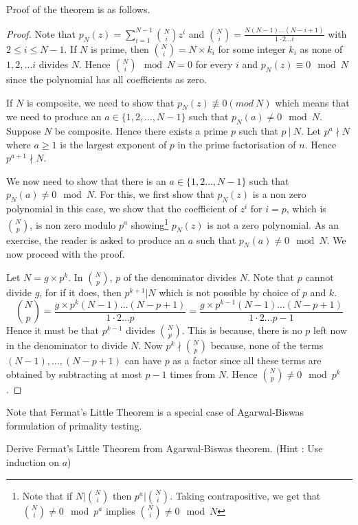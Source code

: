Proof of the theorem is as follows.
\begin{proof}
	Note that $p_N(z) = \sum_{i=1}^{N-1} \binom{N}{i} z^i$ and
	$\binom{N}{i} = \frac{N(N-1)\ldots (N-i+1)}{1\cdot 2 \ldots i}$ with $2
	\le i \le N-1$. 
	If $N$ is prime, then $\binom{N}{i} = N \times k_i$ for some integer
	$k_i$ as none of $1, 2, \ldots i$ divides $N$. Hence $\binom{N}{i}
	\mod N = 0$ for every $i$ and $p_N(z) \equiv 0 \mod N$ since the
	polynomial has all coefficients as zero.

	If $N$ is composite, we need to show that $p_N(z) \not 
	\equiv 0 (mod~ N)$ which means that we need to produce an $a \in
	\{1,2,\ldots, N-1\}$ such that $p_N(a) \ne 0 \mod N$. Suppose $N$ be
	composite. Hence there exists a prime $p$ such that $p ~|~
	N$.  Let $p^a \nmid N$ where $a \ge 1$ is the largest exponent of $p$ in
	the prime factorisation of $n$. Hence $p^{a+1} \nmid N$.
	
	We now need to show that there is an $a \in \{1,2\ldots, N-1\}$ such
	that $p_N(a) \ne 0 \mod N$. For this, we first show that $p_N(z)$ is a 
	non zero polynomial in this case, we 
	show that the coefficient of $z^i$ for $i = p$, which is
	$\binom{N}{p}$, is non zero modulo $p^a$ showing\footnote{Note that if
		$N|\binom{N}{i}$ then $p^a | \binom{N}{i}$. Taking
		contrapositive, we get that $\binom{N}{i} \not = 0 \mod p^a$
		implies $\binom{N}{i} \not = 0 \mod N$} $p_N(z)$ is not a zero
		polynomial. As an exercise, the reader is asked to produce an
		$a$ such that $p_N(a) \ne 0 \mod N$. We now proceed with the
		proof.

	Let $N = g \times p^k$. In $\binom{N}{p}$, $p$ of the denominator 
	divides $N$. Note that $p$ cannot divide $g$, for if it does, then
	$p^{k+1} | N$ which is not possible by choice of $p$ and $k$.
		\begin{equation}
		\binom{N}{p} = \frac{g\times p^k(N-1)\ldots (N-p+1)}
		{1\cdot 2 \ldots p} = \frac{g\times p^{k-1}(N-1)\ldots 
			\label{eq:ag-bis-proof}
		(N-p+1)}{1\cdot 2 \ldots p-1} \end{equation}
	Hence it must be that $p^{k-1}$ divides $\binom{N}{p}$. This is
	because, there is no $p$ left now in the denominator to divide $N$.
	Now $p^k \nmid \binom{N}{p}$ because, none of the terms $(N-1),
	\ldots,
	(N-p+1)$ can have $p$ as a factor since all these terms are obtained by
	subtracting at most $p-1$ times from $N$. Hence $\binom{N}{p} \ne 0
	\mod p^k$.
\end{proof}

Note that Fermat's Little Theorem is a special case of Agarwal-Biswas
formulation of primality testing.
\begin{exercise}
Derive Fermat's Little Theorem from Agarwal-Biswas theorem. (Hint : Use
induction on $a$)
\end{exercise}

